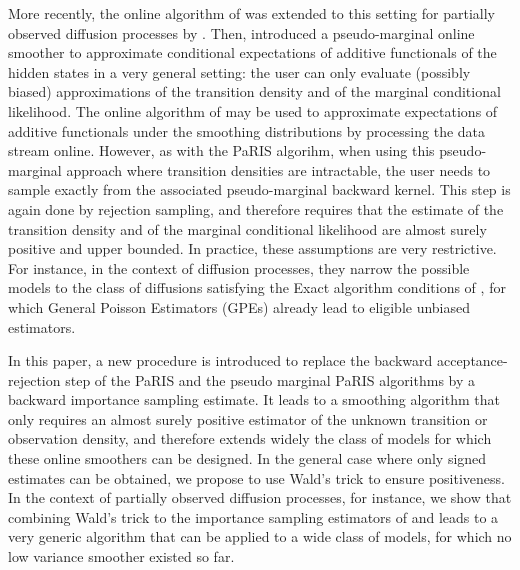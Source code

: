 \documentclass[12pt]{article}
\begin{document}
More recently, the online algorithm of \cite{olsson2017efficient} was extended to this setting for partially observed diffusion processes by \cite{gloaguen2018online}.  Then, \cite{gloaguen2021pseudo} introduced a pseudo-marginal online smoother to approximate conditional expectations of additive functionals of the hidden states in a very general setting: the user can only evaluate (possibly biased) approximations of the transition density and of the marginal conditional likelihood. 
The online algorithm of \cite{gloaguen2021pseudo} may be used to approximate expectations of additive functionals under the smoothing distributions by processing the data stream online.
However, as with the PaRIS algorihm, when using this pseudo-marginal approach where transition densities are intractable, the user needs to sample exactly from the associated pseudo-marginal backward kernel. 
This step is again done by rejection sampling, and therefore requires that the estimate of the transition density and of the marginal conditional  likelihood  are almost surely positive and upper bounded.  
In practice, these assumptions are very restrictive. %
For instance, in the context of diffusion processes, they narrow the possible models to the class of diffusions satisfying the Exact algorithm conditions of \cite{beskos2006retrospective}, for which  General Poisson Estimators (GPEs) \citep{fearnhead2008particle} already lead to eligible unbiased estimators.  

In this paper, a new procedure is introduced to replace the backward acceptance-rejection step of the PaRIS and the pseudo marginal PaRIS algorithms by a backward importance sampling estimate.  %
It leads to a smoothing algorithm that only requires an almost surely positive estimator of the unknown transition or observation density, and therefore extends widely the class of models for which these online smoothers can be designed. 
In the general case where only signed estimates can be obtained, we propose to use  Wald's trick to ensure positiveness. 
 In the context of partially observed diffusion processes, for instance,  we show that combining Wald's trick to the importance sampling estimators of \cite{andersson2017unbiased} and \cite{fearnhead2017continuous} leads to a very generic algorithm that can be applied to a wide class of models, for which no low variance smoother existed so far.
\end{document}
